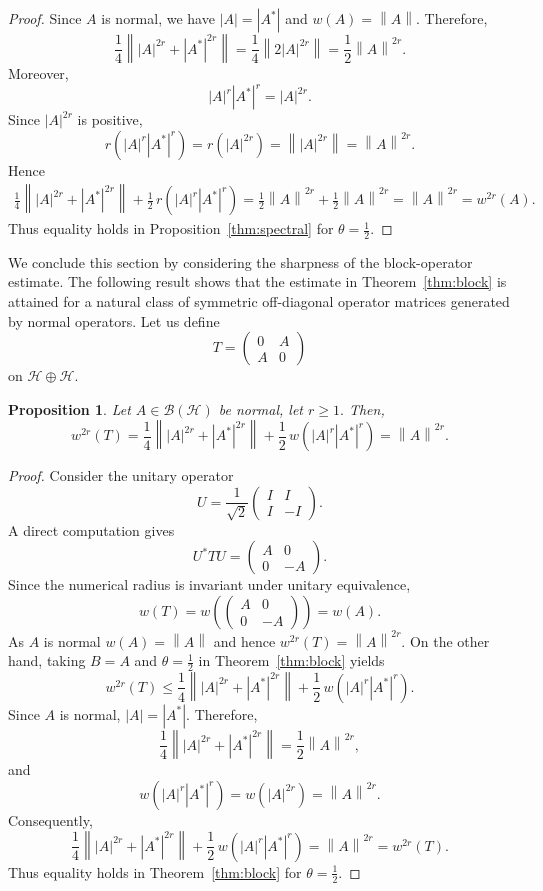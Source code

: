 \documentclass[final,1p,times]{elsarticle}
\newtheorem{prop}[thm]{Proposition}
\newcommand{\BH}{\mathcal{B}(\mathcal{H})}
\newcommand{\norm}[1]{\left\lVert #1 \right\rVert}
\begin{document}
\begin{proof}
Since $A$ is normal, we have $|A|=|A^*|$ and $w(A)=\norm{A}.$
Therefore,
\[
\frac14\norm{|A|^{2r}+|A^*|^{2r}}
=
\frac14\norm{2|A|^{2r}}
=
\frac12\norm{A}^{2r}.
\]
Moreover,
\[
|A|^r|A^*|^r=|A|^{2r}.
\]
Since $|A|^{2r}$ is positive,
\[
r\!\left(|A|^r|A^*|^r\right)
=
r(|A|^{2r})
=
\norm{|A|^{2r}}
=
\norm{A}^{2r}.
\]
Hence
\[
\begin{aligned}
\frac14\norm{|A|^{2r}+|A^*|^{2r}}
+
\frac12\,r\!\left(|A|^r|A^*|^r\right)
=
\frac12\norm{A}^{2r}
+
\frac12\norm{A}^{2r}
=
\norm{A}^{2r}
=
w^{2r}(A).
\end{aligned}
\]
Thus equality holds in Proposition~\ref{thm:spectral} for
$\theta=\frac12$.
\end{proof}

\medskip

We conclude this section by considering the sharpness of the block-operator
estimate. The following result shows that the estimate in
Theorem~\ref{thm:block} is attained for a natural class of symmetric
off-diagonal operator matrices generated by normal operators. Let us define \[
T=
\begin{pmatrix}
0 & A\\
A & 0
\end{pmatrix}
\]
on $\mathcal H\oplus\mathcal H$.

\begin{prop}\label{thm:block-equality}
Let $A\in\BH$ be normal, let $r\geq1.$
Then,
\[
w^{2r}(T)
=
\frac14\norm{|A|^{2r}+|A^*|^{2r}}
+
\frac12\,w\!\left(|A|^r|A^*|^r\right)
=
\norm{A}^{2r}.
\]
\end{prop}

\begin{proof}
Consider the unitary operator
\[
U=
\frac{1}{\sqrt{2}}
\begin{pmatrix}
I&I\\
I&-I
\end{pmatrix}.
\]
A direct computation gives
\[
U^*TU
=
\begin{pmatrix}
A&0\\
0&-A
\end{pmatrix}.
\]
Since the numerical radius is invariant under unitary equivalence,
\[
w(T)
=
w\!\left(
\begin{pmatrix}
A&0\\
0&-A
\end{pmatrix}
\right)
=
w(A).
\]
As $A$ is normal $w(A)=\norm{A}$
and hence $w^{2r}(T)=\norm{A}^{2r}.$ On the other hand, taking $B=A$ and $\theta=\frac12$ in
Theorem~\ref{thm:block} yields
\[
w^{2r}(T)
\leq
\frac14\norm{|A|^{2r}+|A^*|^{2r}}
+
\frac12\,w\!\left(|A|^r|A^*|^r\right).
\]
Since $A$ is normal, $|A|=|A^*|$. Therefore,
\[
\frac14\norm{|A|^{2r}+|A^*|^{2r}}
=
\frac12\norm{A}^{2r},
\]
and
\[
w\!\left(|A|^r|A^*|^r\right)
=
w(|A|^{2r})
=
\norm{A}^{2r}.
\]
Consequently,
\[
\frac14\norm{|A|^{2r}+|A^*|^{2r}}
+
\frac12\,w\!\left(|A|^r|A^*|^r\right)
=
\norm{A}^{2r}
=
w^{2r}(T).
\]
Thus equality holds in Theorem~\ref{thm:block} for
$\theta=\frac12$.
\end{proof}
\end{document}

